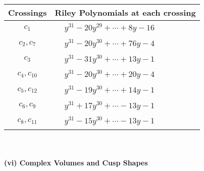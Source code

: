\documentclass[1p]{elsarticle_modified}
\theoremstyle{definition}
\begin{document}
\begin{tabular}{m{50pt}|m{274pt}}
Crossings & \hspace{64pt}Riley Polynomials at each crossing \\
\hline $$\begin{aligned}c_{1}\end{aligned}$$&$\begin{aligned}
&y^{31}-20 y^{29}+\cdots+8 y-16
\end{aligned}$\\
\hline $$\begin{aligned}c_{2},c_{7}\end{aligned}$$&$\begin{aligned}
&y^{31}-20 y^{30}+\cdots+76 y-4
\end{aligned}$\\
\hline $$\begin{aligned}c_{3}\end{aligned}$$&$\begin{aligned}
&y^{31}-31 y^{30}+\cdots+13 y-1
\end{aligned}$\\
\hline $$\begin{aligned}c_{4},c_{10}\end{aligned}$$&$\begin{aligned}
&y^{31}-20 y^{30}+\cdots+20 y-4
\end{aligned}$\\
\hline $$\begin{aligned}c_{5},c_{12}\end{aligned}$$&$\begin{aligned}
&y^{31}-19 y^{30}+\cdots+14 y-1
\end{aligned}$\\
\hline $$\begin{aligned}c_{6},c_{9}\end{aligned}$$&$\begin{aligned}
&y^{31}+17 y^{30}+\cdots-13 y-1
\end{aligned}$\\
\hline $$\begin{aligned}c_{8},c_{11}\end{aligned}$$&$\begin{aligned}
&y^{31}-15 y^{30}+\cdots-13 y-1
\end{aligned}$\\
\hline
\end{tabular}\\~\\
\newpage\flushleft \textbf{(vi) Complex Volumes and Cusp Shapes}
\end{document}
